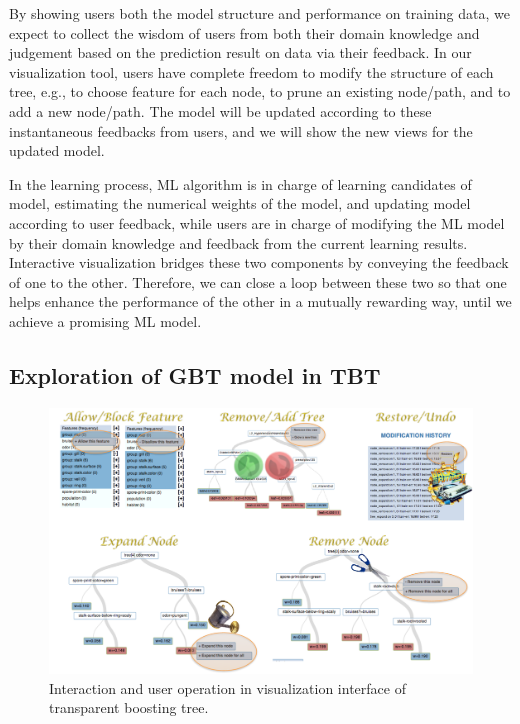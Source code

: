 \documentclass{chi2009}
\begin{document}
By showing users both the model structure and performance on training data, we expect to collect the wisdom of users from both their domain knowledge and judgement based on the prediction result on data via their feedback. In our visualization tool, users have complete freedom to modify the structure of each tree, e.g., to choose feature for each node, to prune an existing node/path, and to add a new node/path. The model will be updated according to these instantaneous feedbacks from users, and we will show the new views for the updated model. 

In the learning process, ML algorithm is in charge of learning candidates of model, estimating the numerical weights of the model, and updating model according to user feedback, while users are in charge of modifying the ML model by their domain knowledge and feedback from the current learning results. Interactive visualization bridges these two components by conveying the feedback of one to the other. Therefore,  we can close a loop between these two so that one helps enhance the performance of the other in a mutually rewarding way, until we achieve a promising ML model.

\subsection{Exploration of GBT model in TBT}

\begin{figure}[tH!]
\begin{center}
 \includegraphics[width=1.05\linewidth]{user.pdf}
\end{center}
   \caption{Interaction and user operation in visualization interface of transparent boosting tree.}
\label{fig:user}
\end{figure} 
\end{document}
